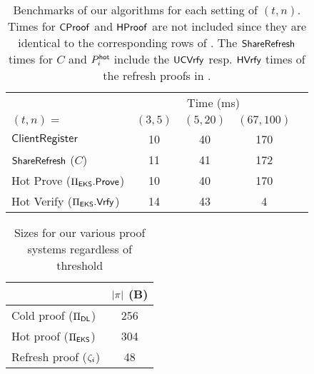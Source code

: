 \begin{table}[tbh]
    \centering
    \begin{tabular}{l cccc}
        \toprule
        & \multicolumn{3}{c}{Time (ms)} \\
        $(t,n)=$                  & $(3,5)$ & $(5,20)$ & $(67,100)$ \\\midrule
        $\mathsf{ClientRegister}$ & 10      & 40       & 170 \\
        $\mathsf{ShareRefresh}$ ($C$)            & 11      & 41       & 172 \\
        Hot Prove ($\Pi_{\sf EKS}.\mathsf{Prove}$) & 10 & 40 & 170 \\
        Hot Verify ($\Pi_{\sf EKS}.\mathsf{Vrfy}$) & 14 & 43 & 4     \\\bottomrule
    \end{tabular}
    \caption{Benchmarks of our algorithms for each setting of $(t,n)$. Times for $\mathsf{CProof}$ and $\mathsf{HProof}$ are not included since they are identical to the corresponding rows of . The $\mathsf{ShareRefresh}$ times for $C$ and $P_i^{\mathsf{hot}}$ include the ${\sf UC}\mathsf{Vrfy}$ resp. ${\sf H}\mathsf{Vrfy}$ times of the refresh proofs in .}
    \label{tab:thresh_bench}
\end{table}

\begin{table}[tbh]
    \centering
    \begin{tabular}{l c}
    \toprule
        & $\lvert \pi \rvert$ (B) \\\midrule
        Cold proof ($\Pi_{\sf DL}$) & 256 \\
        Hot proof ($\Pi_{\sf EKS}$) & 304 \\
        Refresh proof ($\zeta_i$) & 48 \\
        \bottomrule
    \end{tabular}
    \caption{Sizes for our various proof systems regardless of threshold}
    \label{tab:proofs}
\end{table}